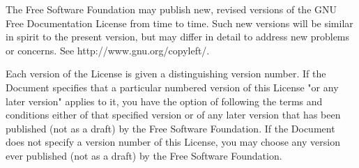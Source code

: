 	The Free Software Foundation may publish new, revised versions
	of the GNU Free Documentation License from time to time.  Such new
	versions will be similar in spirit to the present version, but may
	differ in detail to address new problems or concerns. See
	http://www.gnu.org/copyleft/.

	Each version of the License is given a distinguishing version number.
	If the Document specifies that a particular numbered version of this
	License "or any later version" applies to it, you have the option of
	following the terms and conditions either of that specified version or
	of any later version that has been published (not as a draft) by the
	Free Software Foundation.  If the Document does not specify a version
	number of this License, you may choose any version ever published (not
	as a draft) by the Free Software Foundation.

\endgroup
